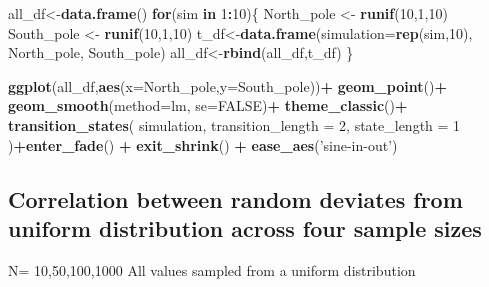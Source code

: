 \documentclass[
]{book}
\newenvironment{Shaded}{\begin{snugshade}}{\end{snugshade}}
\newcommand{\ControlFlowTok}[1]{\textcolor[rgb]{0.13,0.29,0.53}{\textbf{#1}}}
\newcommand{\DataTypeTok}[1]{\textcolor[rgb]{0.13,0.29,0.53}{#1}}
\newcommand{\DecValTok}[1]{\textcolor[rgb]{0.00,0.00,0.81}{#1}}
\newcommand{\KeywordTok}[1]{\textcolor[rgb]{0.13,0.29,0.53}{\textbf{#1}}}
\newcommand{\NormalTok}[1]{#1}
\newcommand{\OperatorTok}[1]{\textcolor[rgb]{0.81,0.36,0.00}{\textbf{#1}}}
\newcommand{\OtherTok}[1]{\textcolor[rgb]{0.56,0.35,0.01}{#1}}
\newcommand{\StringTok}[1]{\textcolor[rgb]{0.31,0.60,0.02}{#1}}
\begin{document}
\begin{Shaded}
\begin{Highlighting}[]
\NormalTok{all_df<-}\KeywordTok{data.frame}\NormalTok{()}
\ControlFlowTok{for}\NormalTok{(sim }\ControlFlowTok{in} \DecValTok{1}\OperatorTok{:}\DecValTok{10}\NormalTok{)\{}
\NormalTok{  North_pole <-}\StringTok{ }\KeywordTok{runif}\NormalTok{(}\DecValTok{10}\NormalTok{,}\DecValTok{1}\NormalTok{,}\DecValTok{10}\NormalTok{)}
\NormalTok{  South_pole <-}\StringTok{ }\KeywordTok{runif}\NormalTok{(}\DecValTok{10}\NormalTok{,}\DecValTok{1}\NormalTok{,}\DecValTok{10}\NormalTok{)}
\NormalTok{  t_df<-}\KeywordTok{data.frame}\NormalTok{(}\DataTypeTok{simulation=}\KeywordTok{rep}\NormalTok{(sim,}\DecValTok{10}\NormalTok{),}
\NormalTok{                                  North_pole,}
\NormalTok{                                  South_pole)}
\NormalTok{  all_df<-}\KeywordTok{rbind}\NormalTok{(all_df,t_df)}
\NormalTok{\}}


\KeywordTok{ggplot}\NormalTok{(all_df,}\KeywordTok{aes}\NormalTok{(}\DataTypeTok{x=}\NormalTok{North_pole,}\DataTypeTok{y=}\NormalTok{South_pole))}\OperatorTok{+}
\StringTok{  }\KeywordTok{geom_point}\NormalTok{()}\OperatorTok{+}
\StringTok{  }\KeywordTok{geom_smooth}\NormalTok{(}\DataTypeTok{method=}\NormalTok{lm, }\DataTypeTok{se=}\OtherTok{FALSE}\NormalTok{)}\OperatorTok{+}
\StringTok{  }\KeywordTok{theme_classic}\NormalTok{()}\OperatorTok{+}
\StringTok{  }\KeywordTok{transition_states}\NormalTok{(}
\NormalTok{    simulation,}
    \DataTypeTok{transition_length =} \DecValTok{2}\NormalTok{,}
    \DataTypeTok{state_length =} \DecValTok{1}
\NormalTok{  )}\OperatorTok{+}\KeywordTok{enter_fade}\NormalTok{() }\OperatorTok{+}\StringTok{ }
\StringTok{  }\KeywordTok{exit_shrink}\NormalTok{() }\OperatorTok{+}
\StringTok{  }\KeywordTok{ease_aes}\NormalTok{(}\StringTok{'sine-in-out'}\NormalTok{)}
\end{Highlighting}
\end{Shaded}

\hypertarget{correlation-between-random-deviates-from-uniform-distribution-across-four-sample-sizes}{%
\subsection{Correlation between random deviates from uniform distribution across four sample sizes}\label{correlation-between-random-deviates-from-uniform-distribution-across-four-sample-sizes}}

N= 10,50,100,1000
All values sampled from a uniform distribution
\end{document}
